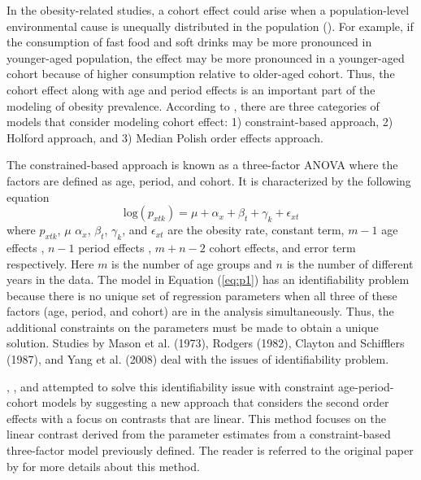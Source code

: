 \documentclass[11pt,letterpaper]{article}
\numberwithin{equation}{section}
\begin{document}
In the obesity-related studies, a cohort effect could arise when a population-level environmental cause is unequally distributed in the population (\cite{Keyes+Utz+Robinson+Li:2010}). For example, if the consumption of fast food and soft drinks may be more pronounced in younger-aged population, the effect may be more pronounced in a younger-aged cohort because of higher consumption relative to older-aged cohort. Thus, the cohort effect along with age and period effects is an important part of the modeling of obesity prevalence. According to \cite{Keyes+Utz+Robinson+Li:2010}, there are three categories of models that consider modeling cohort effect: 1) constraint-based approach, 2) Holford approach, and 3) Median Polish order effects approach.

The constrained-based approach is known as a three-factor ANOVA where the factors are defined as age, period, and cohort. It is characterized by the following equation
\begin{equation}\label{eq:p1}
\text{log}(p_{xtk})=\mu + \alpha_{x} + \beta_{t} + \gamma_{k} + \epsilon_{xt}
\end{equation}
where $p_{xtk}$, $\mu$ $\alpha_{x}$, $\beta_{t}$, $\gamma_{k}$, and $\epsilon_{xt}$ are the obesity rate, constant term, $m-1$ age effects , $n-1$ period effects , $m+n-2$ cohort effects, and error term respectively. Here $m$ is the number of age groups and $n$ is the number of different years in the data. %
The model in Equation (\ref{eq:p1}) has an identifiability problem because there is no unique set of
regression parameters when all three of these factors (age, period, and cohort) are in the analysis
simultaneously. Thus, the additional constraints on the parameters must be made to obtain a unique solution. Studies by Mason et al. (1973), Rodgers (1982), Clayton  and Schifflers (1987), \cite{Glenn:2005} and Yang et al. (2008) deal with the issues of identifiability problem.

\cite{Holford:1983}, \cite{Holford:1991}, and \cite{Holford:1992} attempted to solve this identifiability issue with constraint age-period-cohort models by suggesting a new approach that considers the second order effects with a focus on contrasts that are linear. This method focuses on the linear contrast derived from the parameter estimates from a constraint-based three-factor model previously defined. The reader is referred to the original paper by \cite{Holford:1991} for more details about this method.
\end{document}

